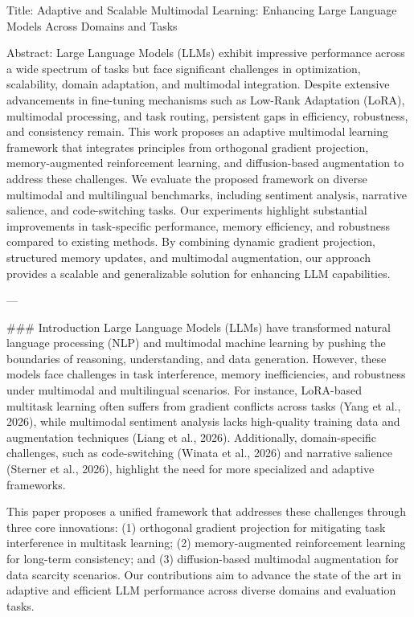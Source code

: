 Title: Adaptive and Scalable Multimodal Learning: Enhancing Large Language Models Across Domains and Tasks

Abstract:  
Large Language Models (LLMs) exhibit impressive performance across a wide spectrum of tasks but face significant challenges in optimization, scalability, domain adaptation, and multimodal integration. Despite extensive advancements in fine-tuning mechanisms such as Low-Rank Adaptation (LoRA), multimodal processing, and task routing, persistent gaps in efficiency, robustness, and consistency remain. This work proposes an adaptive multimodal learning framework that integrates principles from orthogonal gradient projection, memory-augmented reinforcement learning, and diffusion-based augmentation to address these challenges. We evaluate the proposed framework on diverse multimodal and multilingual benchmarks, including sentiment analysis, narrative salience, and code-switching tasks. Our experiments highlight substantial improvements in task-specific performance, memory efficiency, and robustness compared to existing methods. By combining dynamic gradient projection, structured memory updates, and multimodal augmentation, our approach provides a scalable and generalizable solution for enhancing LLM capabilities.

---

### Introduction  
Large Language Models (LLMs) have transformed natural language processing (NLP) and multimodal machine learning by pushing the boundaries of reasoning, understanding, and data generation. However, these models face challenges in task interference, memory inefficiencies, and robustness under multimodal and multilingual scenarios. For instance, LoRA-based multitask learning often suffers from gradient conflicts across tasks (Yang et al., 2026), while multimodal sentiment analysis lacks high-quality training data and augmentation techniques (Liang et al., 2026). Additionally, domain-specific challenges, such as code-switching (Winata et al., 2026) and narrative salience (Sterner et al., 2026), highlight the need for more specialized and adaptive frameworks.

This paper proposes a unified framework that addresses these challenges through three core innovations: (1) orthogonal gradient projection for mitigating task interference in multitask learning; (2) memory-augmented reinforcement learning for long-term consistency; and (3) diffusion-based multimodal augmentation for data scarcity scenarios. Our contributions aim to advance the state of the art in adaptive and efficient LLM performance across diverse domains and evaluation tasks.

